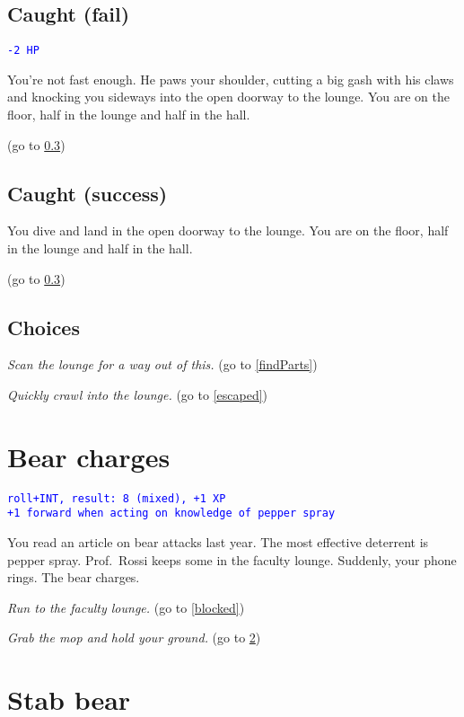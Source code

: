 \documentclass[12pt]{article}
\begin{document}
\subsection{Caught (fail)}\label{caughtFail}

\textcolor{blue}{\texttt{-2 HP}}

You're not fast enough. He paws your shoulder, cutting a big gash with his claws and knocking you sideways into the open doorway to the lounge. You are on the floor, half in the lounge and half in the hall.

(go to \ref{caughtChoices})

\subsection{Caught (success)}\label{caughtSuccess}

You dive and land in the open doorway to the lounge. You are on the floor, half in the lounge and half in the hall.

(go to \ref{caughtChoices})

\subsection{Choices}\label{caughtChoices}

\textit{Scan the lounge for a way out of this.} (go to \ref{findParts})

\textit{Quickly crawl into the lounge.} (go to \ref{escaped})

\section{Bear charges}\label{bearCharges}

\textcolor{blue}{\texttt{roll+INT, result:~8 (mixed), +1 XP}}\\
\textcolor{blue}{\texttt{+1 forward when acting on knowledge of pepper spray}}

You read an article on bear attacks last year. The most effective deterrent is pepper spray. Prof.~Rossi keeps some in the faculty lounge. Suddenly, your phone rings. The bear charges.

\textit{Run to the faculty lounge.} (go to \ref{blocked})

\textit{Grab the mop and hold your ground.} (go to \ref{stabBear})

\section{Stab bear}\label{stabBear}
\end{document}
